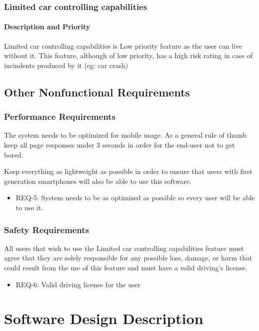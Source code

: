 \documentclass{scrreprt}
\begin{document}
\section{Limited car controlling capabilities}


\subsection{Description and Priority}
Limited car controlling capabilities is Low priority feature as the user can live without it.
This feature, although of low priority, has a high risk
rating in case of incindents produced by it (eg: car crash)


\chapter{Other Nonfunctional Requirements}

\section{Performance Requirements}
The system needs to be optimized for mobile usage.
As a general rule of thumb keep all page responses under 3 seconds in order
for the end-user not to get bored.

Keep everything as lightweight as possible in order to ensure that users with first generation smartphones
will also be able to use this software.

\begin{itemize}
\item REQ-5: System needs to be as optimized as possible so every user will be able to use it.
\end{itemize}
 

\section{Safety Requirements}
All users that wish to use the Limited car controlling capabilities feature must agree
that they are solely responsible for any possible loss, damage, or harm that could result from the use of this feature and must have
a valid driving's license.

\begin{itemize} 
\item REQ-6: Valid driving license for the user 
\end{itemize}

\part{Software Design Description}
\end{document}
